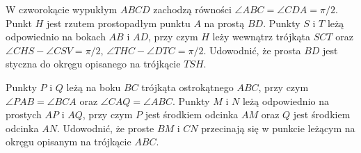 
\begin{exercise}[3/2014]
    W czworokącie wypukłym $ABCD$ zachodzą równości $\angle ABC = \angle CDA = \pi/2$.
    Punkt $H$ jest rzutem prostopadłym punktu $A$ na prostą $BD$.
    Punkty $S$ i $T$ leżą odpowiednio na bokach $AB$ i $AD$, przy czym $H$ leży wewnątrz trójkąta $SCT$ oraz $\angle CHS - \angle CSV = \pi/2$, $\angle THC - \angle DTC = \pi/2$.
    Udowodnić, że prosta $BD$ jest styczna do okręgu opisanego na trójkącie $TSH$.
\end{exercise}

\begin{exercise}[4/2014]
    Punkty $P$ i $Q$ leżą na boku $BC$ trójkąta ostrokątnego $ABC$, przy czym $\angle PAB = \angle BCA$ oraz $\angle CAQ = \angle ABC$.
    Punkty $M$ i $N$ leżą odpowiednio na prostych $AP$ i $AQ$, przy czym $P$ jest środkiem odcinka $AM$ oraz $Q$ jest środkiem odcinka $AN$.
    Udowodnić, że proste $BM$ i $CN$ przecinają się w punkcie leżącym na okręgu opisanym na trójkącie $ABC$.
\end{exercise}
